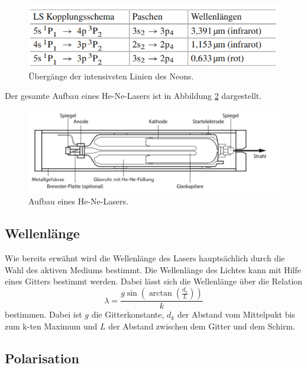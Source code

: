 \begin{figure}
    \centering
    \includegraphics[width=\textwidth]{Bilder/linie.PNG}
    \caption{Übergänge der intensivsten Linien des Neons.\cite{Laser}}
    \label{fig:linie}
\end{figure}

Der gesamte Aufbau eines He-Ne-Lasers ist in Abbildung \ref{fig:he} dargestellt.

\begin{figure}
    \centering
    \includegraphics[width=\textwidth]{Bilder/he.PNG}
    \caption{Aufbau eines He-Ne-Lasers.\cite{Laser}}
    \label{fig:he}
\end{figure}


\subsection{Wellenlänge}

Wie bereits erwähnt wird die Wellenlänge des Lasers hauptsächlich durch die Wahl des aktiven Mediums bestimmt. 
Die Wellenlänge des Lichtes kann mit Hilfe eines Gitters bestimmt werden. Dabei lässt sich die Wellenlänge über die Relation
\begin{equation}
    \label{eqn:lamb}
    \lambda = \frac{g\sin{\left(\arctan{\left(\frac{d_k}{L}\right)}\right)}}{k}
\end{equation}
bestimmen. Dabei ist $g$ die Gitterkonstante, $d_k$ der Abstand vom Mittelpukt bis zum k-ten Maximum und $L$ der Abstand zwischen dem Gitter und dem Schirm.

\subsection{Polarisation}

